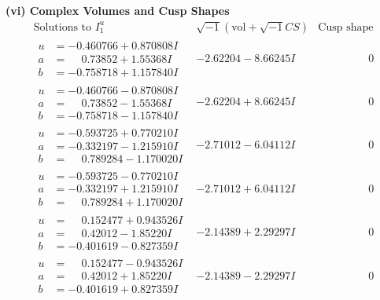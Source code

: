 \documentclass[1p]{elsarticle_modified}
\theoremstyle{definition}
\newcommand{\I}{\sqrt{-1}}
\begin{document}
\newpage\flushleft \textbf{(vi) Complex Volumes and Cusp Shapes}
$$\begin{array}{c|c|c}  
\text{Solutions to }I^u_{1}& \I (\text{vol} + \sqrt{-1}CS) & \text{Cusp shape}\\
 \hline 
\begin{aligned}
u &= -0.460766 + 0.870808 I \\
a &= \phantom{-}0.73852 + 1.55368 I \\
b &= -0.758718 + 1.157840 I\end{aligned}
 & -2.62204 - 8.66245 I & \phantom{-0.000000 } 0 \\ \hline\begin{aligned}
u &= -0.460766 - 0.870808 I \\
a &= \phantom{-}0.73852 - 1.55368 I \\
b &= -0.758718 - 1.157840 I\end{aligned}
 & -2.62204 + 8.66245 I & \phantom{-0.000000 } 0 \\ \hline\begin{aligned}
u &= -0.593725 + 0.770210 I \\
a &= -0.332197 - 1.215910 I \\
b &= \phantom{-}0.789284 - 1.170020 I\end{aligned}
 & -2.71012 - 6.04112 I & \phantom{-0.000000 } 0 \\ \hline\begin{aligned}
u &= -0.593725 - 0.770210 I \\
a &= -0.332197 + 1.215910 I \\
b &= \phantom{-}0.789284 + 1.170020 I\end{aligned}
 & -2.71012 + 6.04112 I & \phantom{-0.000000 } 0 \\ \hline\begin{aligned}
u &= \phantom{-}0.152477 + 0.943526 I \\
a &= \phantom{-}0.42012 - 1.85220 I \\
b &= -0.401619 - 0.827359 I\end{aligned}
 & -2.14389 + 2.29297 I & \phantom{-0.000000 } 0 \\ \hline\begin{aligned}
u &= \phantom{-}0.152477 - 0.943526 I \\
a &= \phantom{-}0.42012 + 1.85220 I \\
b &= -0.401619 + 0.827359 I\end{aligned}
 & -2.14389 - 2.29297 I & \phantom{-0.000000 } 0 \\ \hline\begin{aligned}

\end{aligned}
\end{array}$$
\end{document}
